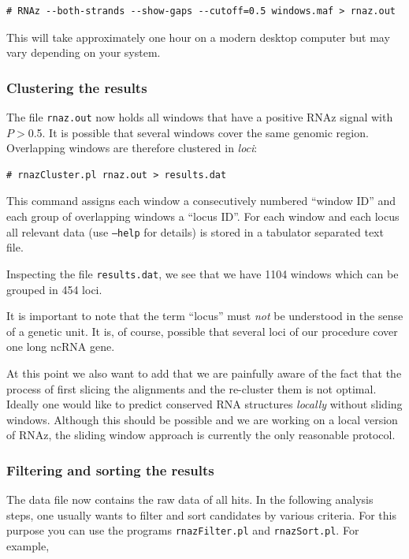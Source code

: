 \documentclass[11pt]{article}
\begin{document}
\begin{verbatim}
# RNAz --both-strands --show-gaps --cutoff=0.5 windows.maf > rnaz.out
\end{verbatim}

This will take approximately one hour on a modern desktop computer but may
vary depending on your system.

\subsubsection{Clustering the results}
\label{sec:clustering-results}

The file \texttt{rnaz.out} now holds all windows that have a positive RNAz
signal with $P>$0.5. It is possible that several windows cover the same
genomic region. Overlapping windows are therefore clustered in \emph{loci}:

\begin{verbatim}
# rnazCluster.pl rnaz.out > results.dat 
\end{verbatim}

This command assigns each window a consecutively numbered ``window ID'' and
each group of overlapping windows a ``locus ID''. For each window and each
locus all relevant data (use \texttt{--help} for details) is stored in a
tabulator separated text file. 

Inspecting the file \texttt{results.dat}, we see that we have 1104 windows
which can be grouped in 454 loci.

It is important to note that the term ``locus'' must \emph{not} be
understood in the sense of a genetic unit. It is, of course, possible that
several loci of our procedure cover one long ncRNA gene.

At this point we also want to add that we are painfully aware of the fact
that the process of first slicing the alignments and the re-cluster them is
not optimal. Ideally one would like to predict conserved RNA structures
\emph{locally} without sliding windows. Although this should be possible
\cite{hofacker04} and we are working on a local version of RNAz, the
sliding window approach is currently the only reasonable protocol.

\subsubsection{Filtering and sorting the results}
\label{sec:filt-sort-results}

The data file now contains the raw data of all hits. In the following
analysis steps, one usually wants to filter and sort candidates by various
criteria. For this purpose you can use the programs \texttt{rnazFilter.pl}
and \texttt{rnazSort.pl}. For example, 
\end{document}
